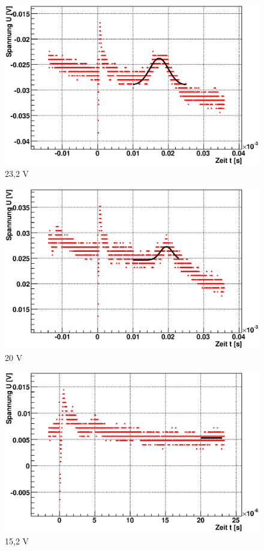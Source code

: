 \documentclass[12pt]{article}
\begin{document}
\begin{figure}[H]  
\begin{minipage}{0.33\linewidth}
\centering
\includegraphics[width=0.9\linewidth]{pictures/varVolt/09.eps}
\small{23,2 V}
\end{minipage}
\begin{minipage}{0.33\linewidth}
\centering
\includegraphics[width=0.9\linewidth]{pictures/varVolt/10.eps}
\small{20 V}
\end{minipage}
\begin{minipage}{0.33\linewidth}
\centering 
\includegraphics[width=0.9\linewidth]{pictures/varVolt/11.eps}
\small{15,2 V}
\end{minipage}
\end{figure}
\end{document}
